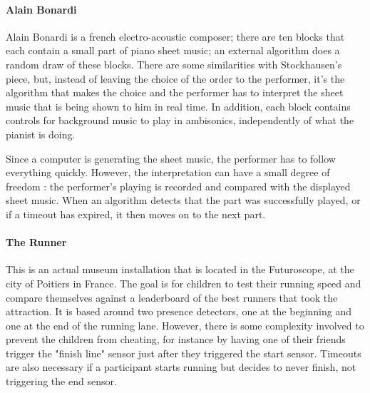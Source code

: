 \documentclass{sigchi}
\begin{document}
\paragraph{Alain Bonardi}
Alain Bonardi is a french electro-acoustic composer; there are ten blocks that each contain a small part of piano sheet music; an external algorithm does a random draw of these blocks. There are some similarities with Stockhausen's piece, but, instead of leaving the choice of the order to the performer, it's the algorithm that makes the choice and the performer has to interpret the sheet music that is being shown to him in real time. In addition, each block contains controls for background music to play in ambisonics, independently of what the pianist is doing.

Since a computer is generating the sheet music, the performer has to follow everything quickly. However, the interpretation can have a small degree of freedom : the performer's playing is recorded and compared with the displayed sheet music. When an algorithm detects that the part was successfully played, or if a timeout has expired, it then moves on to the next part.

\paragraph{The Runner}
This is an actual museum installation that is located in the Futuroscope, at the city of Poitiers in France. The goal is for children to test their running speed and compare themselves against a leaderboard of the best runners that took the attraction. It is based around two presence detectors, one at the beginning and one at the end of the running lane. However, there is some complexity involved to prevent the children from cheating, for instance by having one of their friends trigger the "finish line" sensor just after they triggered the start sensor. Timeouts are also necessary if a participant starts running but decides to never finish, not triggering the end sensor.
\end{document}
